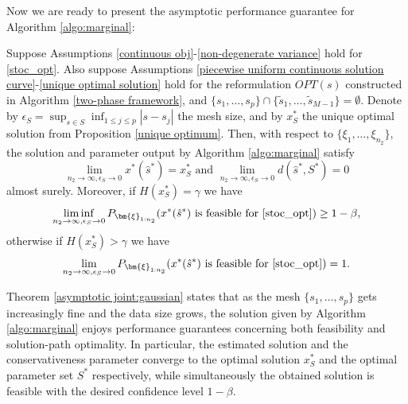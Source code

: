 \documentclass[mnsc,blindrev]{informs4} %
\newcommand{\abs}[1]{\left \vert #1 \right\vert}
\begin{document}
Now we are ready to present the asymptotic performance guarantee for Algorithm \ref{algo:marginal}:
\begin{theorem}\label{asymptotic joint:gaussian}
Suppose Assumptions \ref{continuous obj}-\ref{non-degenerate variance} hold for \eqref{stoc_opt}. Also suppose Assumptions \ref{piecewise uniform continuous solution curve}-\ref{unique optimal solution} hold for the reformulation $OPT(s)$ constructed in Algorithm \ref{two-phase framework}, and $\{s_1,\ldots,s_p\}\cap \{\tilde s_1,\ldots,\tilde s_{M-1}\}=\emptyset$. Denote by $\epsilon_S = \sup_{s\in S}\inf_{1\leq j\leq p}\abs{s-s_j}$ the mesh size, and by $x_S^*$ the unique optimal solution from Proposition \ref{unique optimum}. Then, with respect to $\{\xi_{1},\ldots,\xi_{n_2}\}$, the solution and parameter output by Algorithm \ref{algo:marginal} satisfy
\begin{equation}\label{asymptotic optimality}
    \lim_{n_2\to\infty,\epsilon_S\to 0}x^*(\hat{s}^*)=x_S^* \text{ and } \lim_{n_2\to\infty,\epsilon_S\to 0}d(\hat s^*,S^*)=0
\end{equation}
almost surely. Moreover, if $H(x_S^*)=\gamma$ we have
\begin{equation}\label{feasibility gaussian:boundary}
    \liminf_{n_2\to\infty,\epsilon_S\to 0}P_{\bm{\xi}_{1:n_2}}(x^*(\hat{s}^*)\text{ is feasible for \eqref{stoc_opt}})\geq 1-\beta,
\end{equation}
otherwise if $H(x_S^*)>\gamma$ we have
\begin{equation}\label{feasibility gaussian:interior}
\lim_{n_2\to\infty,\epsilon_S\to 0}P_{\bm{\xi}_{1:n_2}}(x^*(\hat{s}^*)\text{ is feasible for \eqref{stoc_opt}})= 1.
\end{equation}
\end{theorem}
Theorem \ref{asymptotic joint:gaussian} states that as the mesh $\{s_1,\ldots,s_p\}$ gets increasingly fine and the data size grows, the solution given by Algorithm \ref{algo:marginal} enjoys performance guarantees concerning both feasibility and solution-path optimality. In particular, the estimated solution and the conservativeness parameter converge to the optimal solution $x_S^*$ and the optimal parameter set $S^*$ respectively, while simultaneously the obtained solution is feasible with the desired confidence level $1-\beta$.
\end{document}
